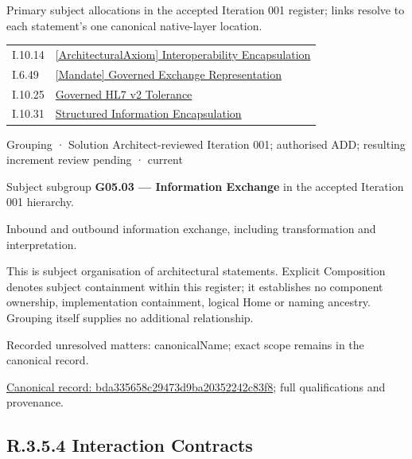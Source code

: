 Primary subject allocations in the accepted Iteration 001 register; links resolve to each statement’s one canonical native-layer location.\par
\begin{longtable}{p{.22\linewidth}p{.73\linewidth}}
I.10.14 & \hyperref[element:e9e0b4f82b6544e7ba87651c578d82c2]{[ArchitecturalAxiom] Interoperability Encapsulation} \\
I.6.49 & \hyperref[element:e9d06b3fe6b744cc86bd2a136e02165a]{[Mandate] Governed Exchange Representation} \\
I.10.25 & \hyperref[element:0968fc163ae54514bc1f02471fe6d866]{Governed HL7 v2 Tolerance} \\
I.10.31 & \hyperref[element:6973441f2d62448188af9bfce5ad9d9f]{Structured Information Encapsulation} \\
\end{longtable}
\label{element:bda335658c29473d9ba20352242c83f8}
{\small Grouping · Solution Architect-reviewed Iteration 001; authorised ADD; resulting increment review pending · current}\par

Subject subgroup \textbf{G05.03 — Information Exchange} in the accepted Iteration 001 hierarchy.



Inbound and outbound information exchange, including transformation and interpretation.



This is subject organisation of architectural statements. Explicit Composition denotes subject containment within this register; it establishes no component ownership, implementation containment, logical Home or naming ancestry. Grouping itself supplies no additional relationship.


{\small Recorded unresolved matters: canonicalName; exact scope remains in the canonical record.}\par
{\footnotesize \href{../../../../continuum/grouping/bda335658c29473d9ba20352242c83f8.md}{Canonical record: bda335658c29473d9ba20352242c83f8}; full qualifications and provenance.}\par
\subsection*{R.3.5.4 Interaction Contracts}
\label{navigation:R.3.5.4}

